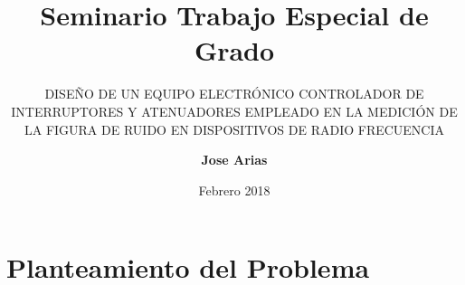 \documentclass[xcolor=pdftext, table]{beamer}
\begin{document}
	\title{Seminario Trabajo Especial de Grado}
	
	\subtitle{\large DISEÑO DE UN EQUIPO ELECTRÓNICO CONTROLADOR DE
		INTERRUPTORES Y ATENUADORES EMPLEADO EN LA
		MEDICIÓN DE LA FIGURA DE RUIDO EN DISPOSITIVOS DE
		RADIO FRECUENCIA}
		
	\author{{\bf Jose Arias}\\
		}		
		
	
	\date{Febrero 2018}
	

	\frame{\titlepage}
	
	\section{Planteamiento del Problema}
	
\end{document}

